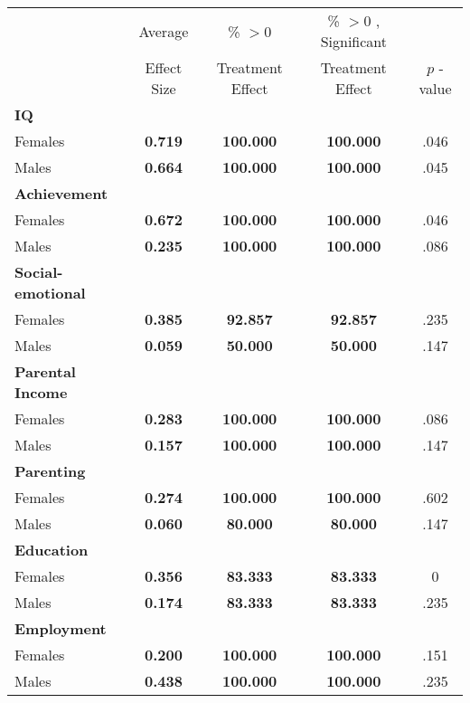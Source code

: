 \begin{tabular}{l c c c c}
\toprule
 & Average & \% $ >0 $ & \% $ >0 $ , Significant & \citet{Rosenbaum_2005_Distribution_JRSS} \\
 & Effect Size & Treatment Effect & Treatment Effect & $ p $ -value \\
\midrule
\textbf{IQ} & & & & \\
\quad Females &  \textbf{    0.719} & \textbf{  100.000} & \textbf{  100.000} & .046 \\
\quad Males &  \textbf{    0.664} & \textbf{  100.000} & \textbf{  100.000} & .045 \\
\midrule
\textbf{Achievement} & & & & \\
\quad Females &  \textbf{    0.672} & \textbf{  100.000} & \textbf{  100.000} & .046 \\
\quad Males &  \textbf{    0.235} & \textbf{  100.000} & \textbf{  100.000} & .086 \\
\midrule
\textbf{Social-emotional} & & & & \\
\quad Females &  \textbf{    0.385} & \textbf{   92.857} & \textbf{   92.857} & .235 \\
\quad Males &  \textbf{    0.059} & \textbf{   50.000} & \textbf{   50.000} & .147 \\
\midrule
\textbf{Parental Income} & & & & \\
\quad Females &  \textbf{    0.283} & \textbf{  100.000} & \textbf{  100.000} & .086 \\
\quad Males &  \textbf{    0.157} & \textbf{  100.000} & \textbf{  100.000} & .147 \\
\midrule
\textbf{Parenting} & & & & \\
\quad Females &  \textbf{    0.274} & \textbf{  100.000} & \textbf{  100.000} & .602 \\
\quad Males &  \textbf{    0.060} & \textbf{   80.000} & \textbf{   80.000} & .147 \\
\midrule
\textbf{Education} & & & & \\
\quad Females &  \textbf{    0.356} & \textbf{   83.333} & \textbf{   83.333} & 0 \\
\quad Males &  \textbf{    0.174} & \textbf{   83.333} & \textbf{   83.333} & .235 \\
\midrule
\textbf{Employment} & & & & \\
\quad Females &  \textbf{    0.200} & \textbf{  100.000} & \textbf{  100.000} & .151 \\
\quad Males &  \textbf{    0.438} & \textbf{  100.000} & \textbf{  100.000} & .235 \\

\end{tabular}
